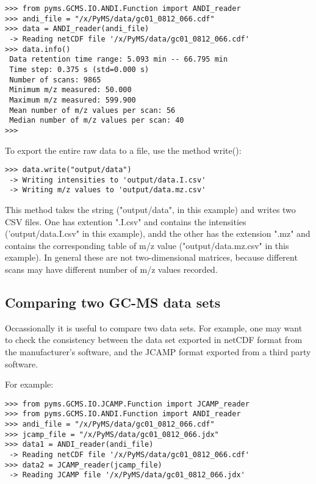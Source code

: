 \begin{verbatim}
>>> from pyms.GCMS.IO.ANDI.Function import ANDI_reader
>>> andi_file = "/x/PyMS/data/gc01_0812_066.cdf"
>>> data = ANDI_reader(andi_file)
 -> Reading netCDF file '/x/PyMS/data/gc01_0812_066.cdf'
>>> data.info()
 Data retention time range: 5.093 min -- 66.795 min
 Time step: 0.375 s (std=0.000 s)
 Number of scans: 9865
 Minimum m/z measured: 50.000
 Maximum m/z measured: 599.900
 Mean number of m/z values per scan: 56
 Median number of m/z values per scan: 40
>>>
\end{verbatim}

To export the entire raw data to a file, use the method write():

\begin{verbatim}
>>> data.write("output/data")
 -> Writing intensities to 'output/data.I.csv'
 -> Writing m/z values to 'output/data.mz.csv'
\end{verbatim}

This method takes the string ("output/data", in this example)
and writes two CSV files. One has extention ".I.csv" and
contains the intensities ('output/data.I.csv" in this example),
andd the other has the extension ".mz" and contains the
corresponding table of m/z value ("output/data.mz.csv" in
this example). In general these are not two-dimensional matrices,
because different scans may have different number of m/z
values recorded.

\subsection{Comparing two GC-MS data sets}


Occassionally it is useful to compare two data sets. For example,
one may want to check the consistency between the data set
exported in netCDF format from the manufacturer's software, and
the JCAMP format exported from a third party software.

For example:

\begin{verbatim}
>>> from pyms.GCMS.IO.JCAMP.Function import JCAMP_reader
>>> from pyms.GCMS.IO.ANDI.Function import ANDI_reader
>>> andi_file = "/x/PyMS/data/gc01_0812_066.cdf"
>>> jcamp_file = "/x/PyMS/data/gc01_0812_066.jdx"
>>> data1 = ANDI_reader(andi_file)
 -> Reading netCDF file '/x/PyMS/data/gc01_0812_066.cdf'
>>> data2 = JCAMP_reader(jcamp_file)
 -> Reading JCAMP file '/x/PyMS/data/gc01_0812_066.jdx'
\end{verbatim}

